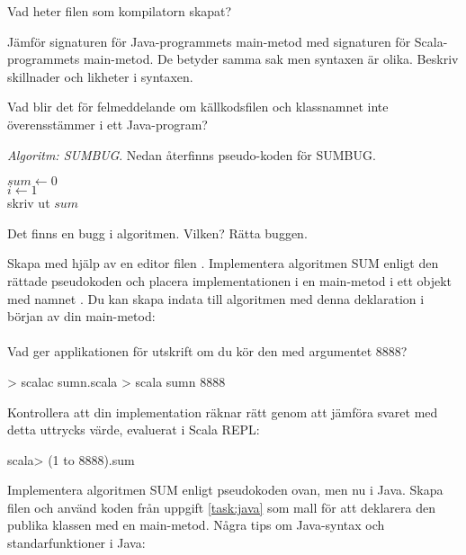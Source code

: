 \Subtask\Pen Vad heter filen som kompilatorn skapat?

\Subtask\Pen Jämför signaturen för Java-programmets main-metod med signaturen för Scala-programmets main-metod. De betyder samma sak men syntaxen är olika. Beskriv skillnader och likheter i syntaxen.

\Subtask\Pen Vad blir det för felmeddelande om källkodsfilen och klassnamnet inte överensstämmer i ett Java-program?


\Task \emph{Algoritm: SUMBUG}. Nedan återfinns pseudo-koden för SUMBUG. 

\begin{algorithm}[H]
 
 $sum \leftarrow 0$ \\
 $i \leftarrow 1$  \\
 skriv ut $sum$
\end{algorithm}

\Subtask\Pen Det finns en bugg i algoritmen. Vilken? Rätta buggen.

\Subtask Skapa med hjälp av en editor filen . Implementera algoritmen SUM enligt den rättade pseudokoden och placera implementationen i en main-metod i ett objekt med namnet . Du kan skapa indata  till algoritmen med denna deklaration i början av din main-metod: \\  \\ Vad ger applikationen för utskrift om du kör den med argumentet 8888? 

\begin{REPL}
> scalac sumn.scala
> scala sumn 8888
\end{REPL}

\Subtask Kontrollera att din implementation räknar rätt genom att jämföra svaret med detta uttrycks värde, evaluerat i Scala REPL:
\begin{REPL}
scala> (1 to 8888).sum
\end{REPL}

\Subtask Implementera algoritmen SUM enligt pseudokoden ovan, men nu i Java. Skapa filen  och använd koden från uppgift \ref{task:java} som mall för att deklarera den publika klassen  med en main-metod. Några tips om Java-syntax och standarfunktioner i Java: 

